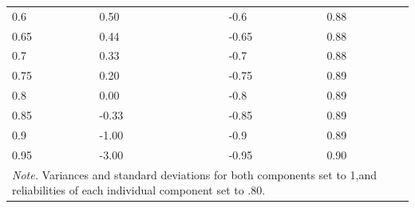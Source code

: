 \documentclass[authordate, meta]{jote-new-article}
\begin{document}
\begin{table}[H]
\begin{fullwidth}
\begin{tabular}{@{} l l l l l@{}}
			 0.6 & 0.50 &  & -0.6 & 0.88 \\

			 0.65 & 0.44 &  & -0.65 & 0.88 \\

			 0.7 & 0.33 &  & -0.7 & 0.88 \\

			 0.75 & 0.20 &  & -0.75 & 0.89 \\

			 0.8 & 0.00 &  & -0.8 & 0.89 \\

			 0.85 & -0.33 &  & -0.85 & 0.89 \\

			 0.9 & -1.00 &  & -0.9 & 0.89 \\

			 0.95 & -3.00 &  & -0.95 & 0.90 \\
			 \hline
			\multicolumn{5}{p{10cm}}{\emph{Note. }Variances and standard deviations for both components set to 1,\newline and reliabilities of each individual component set to .80.}


		\end{tabular}
		\end{fullwidth}
	\end{table}
\end{document}
